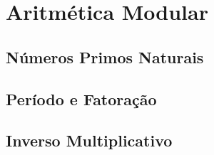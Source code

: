 \chapter {Aritm\'{e}tica Modular}
\label{Mod}


\section{N\'{u}meros Primos Naturais}	

\section{Per\'{i}odo e Fatora\c{c}\~{a}o}

\section{Inverso Multiplicativo}
